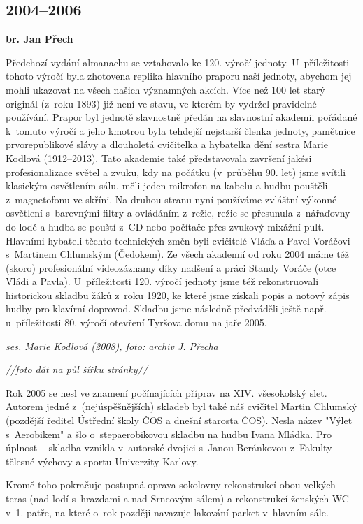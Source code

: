 \documentclass[a5paper, 12pt, twoside]{article}
\begin{document}
\subsection{2004--2006}

\textbf{br. Jan Přech}

Předchozí vydání almanachu se vztahovalo ke 120. výročí jednoty. U~příležitosti tohoto výročí byla zhotovena replika hlavního praporu naší
jednoty, abychom jej mohli ukazovat na všech našich významných akcích.
Více než 100 let starý originál (z~roku 1893) již není ve stavu, ve
kterém by vydržel pravidelné používání. Prapor byl jednotě slavnostně
předán na slavnostní akademii pořádané k~tomuto výročí a jeho kmotrou
byla tehdejší nejstarší členka jednoty, pamětnice prvorepublikové slávy
a dlouholetá cvičitelka a hybatelka dění sestra Marie Kodlová
(1912--2013). Tato akademie také představovala završení jakési
profesionalizace světel a zvuku, kdy na počátku (v~průběhu 90. let) jsme
svítili klasickým osvětlením sálu, měli jeden mikrofon na kabelu a hudbu
pouštěli z~magnetofonu ve skříni. Na druhou stranu nyní používáme
zvláštní výkonné osvětlení s~barevnými filtry a ovládáním z~režie, režie
se přesunula z~nářaďovny do lodě a hudba se pouští z~CD nebo počítače
přes zvukový mixážní pult. Hlavními hybateli těchto technických změn
byli cvičitelé Vláďa a Pavel Voráčovi s~Martinem Chlumským (Čedokem). Ze
všech akademií od roku 2004 máme též (skoro) profesionální videozáznamy
díky nadšení a práci Standy Voráče (otce Vládi a Pavla). U~příležitosti
120. výročí jednoty jsme též rekonstruovali historickou skladbu žáků
z~roku 1920, ke které jsme získali popis a notový zápis hudby pro klavírní
doprovod. Skladbu jsme následně předváděli ještě např. u~příležitosti
80. výročí otevření Tyršova domu na jaře 2005.

\textit{ses. Marie Kodlová (2008), foto: archiv J. Přecha}

\textit{//foto dát na půl šířku stránky//}

Rok 2005 se nesl ve znamení počínajících příprav na XIV. všesokolský
slet. Autorem jedné z~(nejúspěšnějších) skladeb byl také náš cvičitel
Martin Chlumský (pozdější ředitel Ústřední školy ČOS a dnešní starosta
ČOS). Nesla název "Výlet s~Aerobikem" a šlo o~stepaerobikovou skladbu
na hudbu Ivana Mládka. Pro úplnost -- skladba vznikla v~autorské dvojici
s~Janou Beránkovou z~Fakulty tělesné výchovy a sportu Univerzity
Karlovy.

Kromě toho pokračuje postupná oprava sokolovny rekonstrukcí obou velkých
teras (nad lodí s~hrazdami a nad Srncovým sálem) a rekonstrukcí ženských
WC v~1. patře, na které o~rok později navazuje lakování parket v~hlavním
sále.
\end{document}
